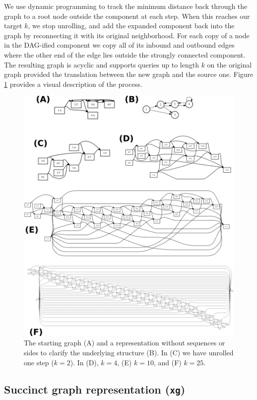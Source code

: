 \documentclass[12pt]{article}
\begin{document}
We use dynamic programming to track the minimum distance back through the graph to a root node outside the component at each step.
When this reaches our target $k$, we stop unrolling, and add the expanded component back into the graph by reconnecting it with its original neighborhood.
For each copy of a node in the DAG-ified component we copy all of its inbound and outbound edges where the other end of the edge lies outside the strongly connected component.
The resulting graph is acyclic and supports queries up to length $k$ on the original graph provided the translation between the new graph and the source one.
Figure \ref{fig:kdagify} provides a visual description of the process.

\begin{figure}[t]
\centering
\includegraphics[width=1.0\textwidth]{figures/kdagify}
\caption{\label{fig:kdagify}
  The starting graph (A) and a representation without sequences or sides to clarify the underlying structure (B).
  In (C) we have unrolled one step ($k = 2$). In (D), $k = 4$, (E) $k = 10$, and (F) $k = 25$.
}
\end{figure}

\subsection{Succinct graph representation ({\tt xg})}
\end{document}
